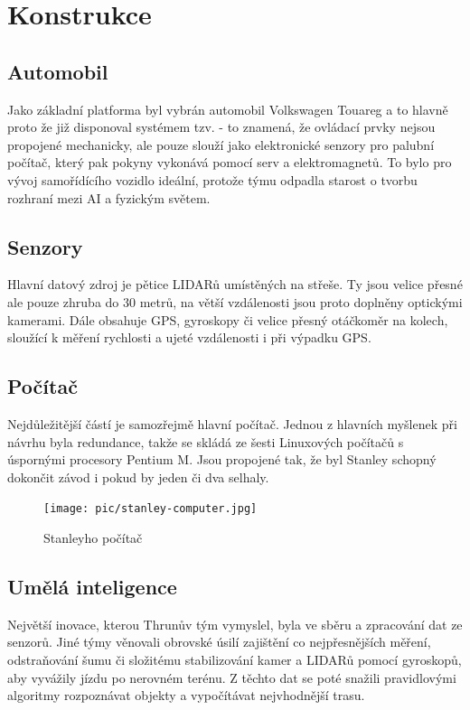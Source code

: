 \documentclass[12pt]{article}
\begin{document}
\section{Konstrukce}

\subsection{Automobil}
Jako základní platforma byl vybrán automobil Volkswagen Touareg a to hlavně proto že již disponoval systémem
tzv.  - to znamená, že ovládací prvky nejsou propojené mechanicky, ale pouze slouží jako
elektronické senzory pro palubní počítač, který pak pokyny vykonává  pomocí serv a elektromagnetů.
To bylo pro vývoj samořídícího vozidlo ideální, protože týmu odpadla starost o tvorbu rozhraní mezi AI
a fyzickým světem.

\subsection{Senzory}
Hlavní datový zdroj je pětice LIDARů umístěných na střeše. Ty jsou velice přesné ale pouze zhruba do 30
metrů, na větší vzdálenosti jsou proto doplněny optickými kamerami. Dále obsahuje GPS, gyroskopy či
velice přesný otáčkoměr na kolech, sloužící k měření rychlosti a ujeté vzdálenosti i při výpadku GPS.

\subsection{Počítač}
Nejdůležitější částí je samozřejmě hlavní počítač. Jednou z hlavních myšlenek při návrhu byla redundance,
takže se skládá ze šesti Linuxových počítačů s úspornými procesory Pentium M. Jsou propojené tak, že byl
Stanley schopný dokončit závod i pokud by jeden či dva selhaly. 


\begin{figure}[h!]
    \centering
    \texttt{[image: pic/stanley-computer.jpg]}
    \caption{Stanleyho počítač}
    \label{fig:computer}
\end{figure}

\subsection{Umělá inteligence}
Největší inovace, kterou Thrunův tým vymyslel, byla ve sběru a zpracování dat ze senzorů. Jiné týmy
věnovali obrovské úsilí zajištění co nejpřesnějších měření, odstraňování šumu či složitému stabilizování
kamer a LIDARů pomocí gyroskopů, aby vyvážily jízdu po nerovném terénu. Z těchto dat se poté snažili
pravidlovými algoritmy rozpoznávat objekty a vypočítávat nejvhodnější trasu.
\end{document}
